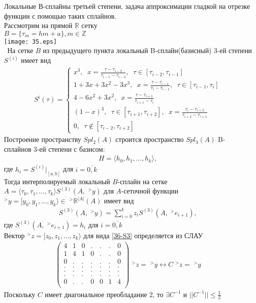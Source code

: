 \documentclass[__main__.tex]{subfiles}
\begin{document}
Локальные В-сплайны третьей степени, задача аппроксимации гладкой на отрезке функции с помощью таких сплайнов.\\

Рассмотрим на прямой $\underline{\mathbb{R}}$ сетку\\ $B = \{\tau_m = hm + a\}, m \in \mathbb{Z}$\\
\texttt{[image: 35.eps]}\\
\
На сетке $B$ из предыдущего пункта локальный B-сплайн(базисный) 3-ей степени $S^{(i)}$ имеет вид	
\begin{gather*}
	S^i(\tau) = 
	\begin{cases}
		x^3, \;\; x = \frac{\tau - \tau_{i-2}}{\tau_{i-1} - \tau_{i-2}}, \;\; \tau \in [\tau_{i-2}, \tau_{i-1}]\\
		1 + 3x + 3x^2 - 3x^3, \;\; x = \frac{\tau - \tau_{i-1}}{\tau_i - \tau_{i-1}}, \;\; \tau \in [\tau_{i-1}, \tau_i]\\
		4 - 6x^2 + 3x^2, \;\; x = \frac{\tau - \tau_{i+1}}{\tau_{i+1} - \tau_{i}}\\
		(1-x)^3, \;\; \tau \in [\tau_{i+1}, \tau_{i+2}], \;\; x = \frac{\tau_i - \tau_{i+2}}{\tau_{i+2} - \tau_{i+1}}\\
		0, \;\; \tau \notin [\tau_{i-2}, \tau_{i+2}]
	\end{cases}
\end{gather*}
Построение пространству $Spl_2(A)$ строится пространство $Spl_3(A)$ B-сплайнов 3-ей степени с базисом:
\begin{gather*}
	H = \langle h_0, h_1, ..., h_k \rangle,
\end{gather*}
где $h_i = S^{(i)}|_{[a, b]}$ для $i = \overline{0,k}$\\
Тогда интерполируемый локальный $B$-сплайн на сетке $A = \langle \tau_0, \tau_1, ..., \tau_k \rangle S^{(3)}(A, \;^>y)$ для $A$-сеточной функции $^>y = [ y_0, y_1, ..., y_k \rangle \in\; ^> \mathbb{R}^{|A|}(A)$ имеет вид 
\begin{gather}
S^{(3)}(A, \;^>y) = \sum_{i=0}^{k}{z_iS^{(3)}(A, \;^>e_{i+1})},
\label{36-S3}	
\end{gather}
где $S^{(3)}(A, \;^>e_{i+1}) = h_i$ для $i = \overline{0,k}$\\
Вектор $^>z = [ z_0, z_1, ..., z_k \rangle$ для вида \ref{36-S3} определяется из СЛАУ
\begin{gather*}
	\begin{pmatrix}
		4 & 1 & 0 & . & . & . & 0\\
		1 & 4 & 1 & 0 & . & . & 0\\
		0 & . & . & . & . & . & 0\\
		. & . & . & . & . & . & .\\
		. & . & . & . & . & . & .\\
		. & . & . & . & . & . & .\\
		0 & . & . & 0 & 0 & 1 & 4\\				
	\end{pmatrix}
	\;^>z = \;^>y \leftrightarrow C\;^>z = \;^>y
\end{gather*}
Поскольку $C$ имеет диагональное преобладание 2, то $\exists C^{-1}$ и $||C^{-1}||\leq \frac{1}{2}$
\end{document}
